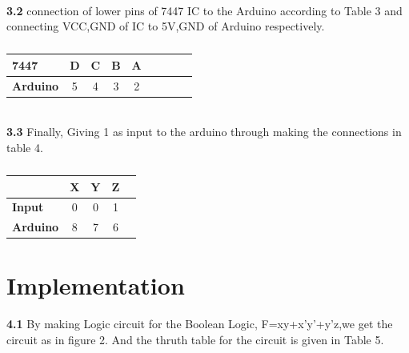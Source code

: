 \documentclass[10pt, a4paper]{article}
\begin{document}
\\	\textbf{3.2}
	connection of lower pins of 7447 IC to the Arduino according to Table 3 and connecting VCC,GND of IC to 5V,GND of Arduino respectively.
		\begin{table}[htbp]
    \begin{center}
    \begin{tabular}{|l|c|c|c|c|c|c|c|c} \hline \textbf{7447}
  & D & C & B & A \\
 \hline
\textbf{Arduino} & 5 & 4 & 3 & 2\\ \hline
\end{tabular}   
\end{center}
\caption{\label{table:dummytable} }
\end{table}
\\\textbf{3.3}
Finally, Giving 1 as input to the arduino through making the connections in table 4.
	\begin{table}[htbp]
    \begin{center}
    \begin{tabular}{|l|c|c|c|c|} \hline 
  & X & Y & Z \\
 \hline
\textbf{Input} & 0 & 0 & 1 \\ \hline
\textbf{Arduino} & 8 & 7 & 6\\ \hline
\end{tabular}   
\end{center}
\caption{\label{table:dummytable} }
\end{table}
\section{Implementation}
\textbf{4.1}
By making Logic circuit for the Boolean Logic, F=xy+x'y'+y'z,we get the circuit as in figure 2.
And the thruth table for the circuit is given in Table 5.
\end{document}
